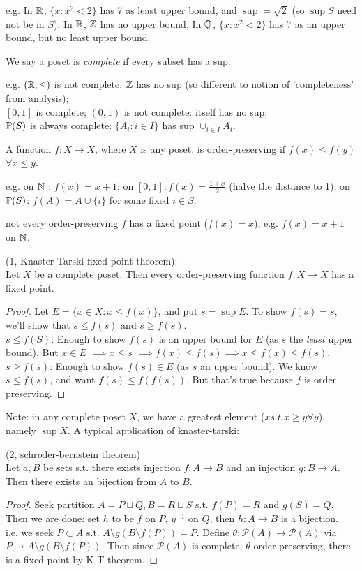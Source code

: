 \documentclass[a4paper]{article}
\begin{document}
e.g. In $\R$, $\{x:x^2<2\}$ has 7 as least upper bound, and $\sup = \sqrt{2}$ (so $\sup S$ need not be in $S$). In $\R$, $\Z$ has no upper bound. In $\Q$, $\{x:x^2 < 2\}$ has 7 as an upper bound, but no least upper bound.

We say a poset is \emph{complete} if every subset has a sup.

e.g. $(\R,\leq)$ is not complete: $\Z$ has no sup (so different to notion of 'completeness' from analysis);\\
$[0,1]$ is complete; $(0,1)$ is not complete: itself has no sup;\\
$\P(S)$ is always complete: $\{A_i: i \in I\}$ has sup $\cup_{i \in I} A_i$.

A function $f:X \to X$, where $X$ is any poset, is order-preserving if $f(x) \leq f(y)$ $\forall x \leq y$.

e.g. on $\N$ : $f(x) = x+1$; on $[0,1]: f(x) = \frac{1+x}{2}$ (halve the distance to 1); on $\P(S)$: $f(A) = A \cup \{i\}$ for some fixed $i \in S$.

not every order-preserving $f$ has a fixed point ($f(x) = x$), e.g. $f(x) = x+1$ on $\N$.

\begin{thm} (1, Knaster-Tarski fixed point theorem):\\
Let $X$ be a complete poset. Then every order-preserving function $f:X \to X$ has a fixed point.
\begin{proof}
Let $E = \{x \in X: x \leq f(x)\}$, and put $s = \sup E$. To show $f(s) = s$, we'll show that $s \leq f(s)$ and $s \geq f(s)$.\\
$s \leq f(S)$: Enough to show $f(s)$ is an upper bound for $E$ (as $s$ the \emph{least} upper bound). But $x \in E$ $\implies x \leq s$ $\implies f(x) \leq f(s) \implies x \leq f(x) \leq f(s)$.\\
$s \geq f(s)$: Enough to show $f(s) \in E$ (as $s$ an upper bound). We know $s \leq f(s)$, and want $f(s) \leq f(f(s))$. But that's true because $f$ is order preserving.
\end{proof}
\end{thm}

Note: in any complete poset $X$, we have a greatest element ($x s.t. x \geq y \forall y$), namely $\sup X$. A typical application of knaster-tarski:

\begin{thm} (2, schr$\ddot{o}$der-bernstein theorem)\\
Let $a,B$ be sets s.t. there exists injection $f:A \to B$ and an injection $g:B \to A$. Then there exists an bijection from $A$ to $B$.
\begin{proof}
Seek partition $A = P \sqcup Q,B = R \sqcup S$ s.t. $f(P) = R$ and $g(S) = Q$. Then we are done: set $h$ to be $f$ on $P$, $y^{-1}$ on $Q$, then $h:A \to B$ is a bijection.\\
i.e. we seek $P \subset A$ s.t. $A \setminus g(B\setminus f(P)) = P$. Define $\theta: \mathcal{P}(A) \to \mathcal{P}(A)$ via $P \to A \setminus g(B\setminus f(P))$. Then since $\mathcal{P}(A)$ is complete, $\theta$ order-preserving, there is a fixed point by K-T theorem.
\end{proof}
\end{thm}
\end{document}
